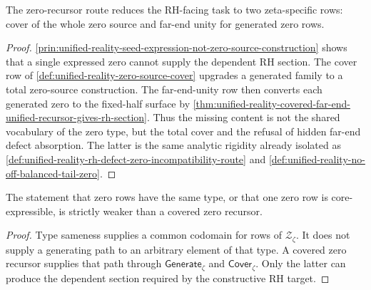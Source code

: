 \begin{theorem}
\label{thm:unified-reality-zero-recursor-cover-isolates-hard-point}
The zero-recursor route reduces the RH-facing task to two zeta-specific
rows: cover of the whole zero source and far-end unity for generated
zero rows.
\end{theorem}

\begin{proof}
\autoref{prin:unified-reality-seed-expression-not-zero-source-construction}
shows that a single expressed zero cannot supply the dependent RH
section.  The cover row of
\autoref{def:unified-reality-zero-source-cover} upgrades a generated
family to a total zero-source construction.  The far-end-unity row then
converts each generated zero to the fixed-half surface by
\autoref{thm:unified-reality-covered-far-end-unified-recursor-gives-rh-section}.
Thus the missing content is not the shared vocabulary of the zero type,
but the total cover and the refusal of hidden far-end defect absorption.
The latter is the same analytic rigidity already isolated as
\autoref{def:unified-reality-rh-defect-zero-incompatibility-route} and
\autoref{def:unified-reality-no-off-balanced-tail-zero}.
\end{proof}

\begin{corollary}
\label{cor:unified-reality-zero-type-sameness-weaker-than-recursor-totality}
The statement that zero rows have the same type, or that one zero row is
core-expressible, is strictly weaker than a covered zero recursor.
\end{corollary}

\begin{proof}
Type sameness supplies a common codomain for rows of
$\mathcal Z_{\zeta}$.  It does not supply a generating path to an
arbitrary element of that type.  A covered zero recursor supplies that
path through $\mathsf{Generate}_{\zeta}$ and $\mathsf{Cover}_{\zeta}$.
Only the latter can produce the dependent section required by the
constructive RH target.
\end{proof}
